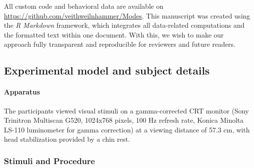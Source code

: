 \documentclass[
]{article}
\begin{document}
All custom code and behavioral data are available on
\url{https://github.com/veithweilnhammer/Modes}. This manuscript was
created using the \emph{R Markdown} framework, which integrates all
data-related computations and the formatted text within one document.
With this, we wish to make our approach fully transparent and
reproducible for reviewers and future readers.

\hypertarget{experimental-model-and-subject-details}{%
\subsection{Experimental model and subject
details}\label{experimental-model-and-subject-details}}

\hypertarget{apparatus}{%
\paragraph{Apparatus}\label{apparatus}}

The participants viewed visual stimuli on a gamma-corrected CRT monitor
(Sony Trinitron Multiscan G520, 1024x768 pixels, 100 Hz refresh rate,
Konica Minolta LS-110 luminometer for gamma correction) at a viewing
distance of 57.3 cm, with head stabilization provided by a chin rest.

\hypertarget{stimuli-and-procedure}{%
\subsubsection{Stimuli and Procedure}\label{stimuli-and-procedure}}
\end{document}

